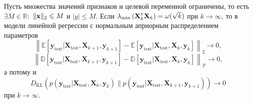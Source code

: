 \begin{theorem}[Киселев, 2024]\label{theorem5}
    Пусть множества значений признаков и целевой переменной ограничены, то есть $\exists M \in \mathbb{R}:$ $\| \mathbf{x} \|_2 \leqslant M$ и $|y| \leqslant M$. Если  $\lambda_{\min}\left( \mathbf{X}^{\text{\tiny\sffamily\upshape\mdseries T}}_k \mathbf{X}_k \right) = \omega(\sqrt{k})$ при $k \to \infty$, то в модели линейной регрессии с нормальным априорным распределением параметров
    \[ \left\|\mathbb{E}\left[ \mathbf{y}_{\mathrm{test}}|\mathbf{X_{\mathrm{test}}}, \mathbf{X}_{k+1}, \mathbf{y}_{k+1} \right] - \mathbb{E}\left[ \mathbf{y}_{\mathrm{test}}|\mathbf{X_{\mathrm{test}}}, \mathbf{X}_{k}, \mathbf{y}_{k} \right]\right\|_2 \to 0, \]
    \[ \left\|\mathbb{D}\left[ \mathbf{y}_{\mathrm{test}}|\mathbf{X_{\mathrm{test}}}, \mathbf{X}_{k+1}, \mathbf{y}_{k+1} \right] - \mathbb{D}\left[ \mathbf{y}_{\mathrm{test}}|\mathbf{X_{\mathrm{test}}}, \mathbf{X}_{k}, \mathbf{y}_{k} \right]\right\|_F \to 0, \]
    а потому и
    \[ D_{\mathrm{KL}}\left(p(\mathbf{y}_{\mathrm{test}}|\mathbf{X_{\mathrm{test}}}, \mathbf{X}_k, \mathbf{y}_k) \| p(\mathbf{y}_{\mathrm{test}}|\mathbf{X_{\mathrm{test}}}, \mathbf{X}_{k+1}, \mathbf{y}_{k+1})\right) \to 0  \]
    при $k \to \infty$.
\end{theorem}